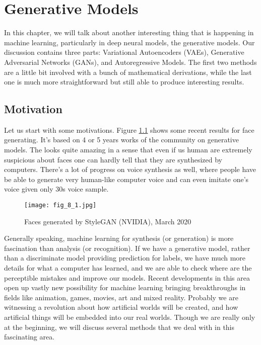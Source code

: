 \documentclass[../main.tex]{subfiles}
\begin{document}

\chapter{Generative Models}
In this chapter, we will talk about another interesting thing that is happening in machine learning, particularly in deep neural models, the generative models. Our discussion contains three parts: Variational Autoencoders (VAEs),  Generative Adversarial Networks (GANs), and Autoregressive Models. The first two methods are a little bit involved with a bunch of mathematical derivations, while the last one is much more straightforward but still able to produce interesting results. 
\section{Motivation}
Let us start with some motivations. Figure \ref{fig_8_1} shows some recent results for face generating. It's based on 4 or 5 years works of the community on generative models. The looks quite amazing in a sense that even if us human are extremely suspicious about faces one can hardly tell that they are synthesized by computers. There's a lot of progress on voice synthesis as well, where people have be able to generate very human-like computer voice and can even imitate one's voice given only 30s voice sample.
\begin{figure}[h] 
	\centering 
	\texttt{[image: fig\_8\_1.jpg]} 
	\caption{Faces generated by StyleGAN (NVIDIA), March 2020}\label{fig_8_1}
\end{figure}
\par Generally speaking, machine learning for synthesis (or generation) is more fascination than analysis (or recognition). If we have a generative model, rather than a discriminate model providing prediction for labels, we have much more details for what a computer has learned, and we are able to check where are the perceptible mistakes and improve our models. Recent developments in this area open up vastly new possibility for machine learning bringing breakthroughs in fields like animation, games, movies, art and mixed reality. Probably we are witnessing a revolution about how artificial worlds will be created, and how artificial things will be embedded into our real worlds. Though we are really only at the beginning, we will discuss several methods that we deal with in this fascinating area.
\end{document}
